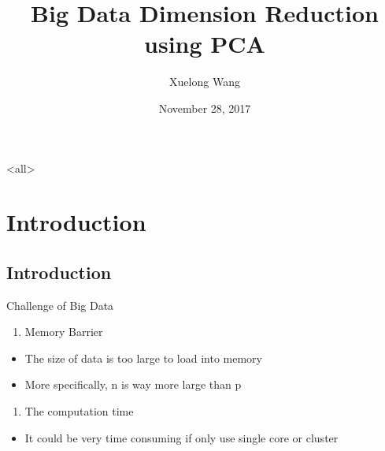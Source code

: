 \documentclass[ignorenonframetext,]{beamer}
\author[
Xuelong Wang
]{Xuelong Wang}
\date[
11/28/2017
]{
November 28, 2017
}
\providecommand{\tightlist}{%
  \setlength{\itemsep}{0pt}\setlength{\parskip}{0pt}}
\begin{document}
\mode<all>{
\title[
PCA on Big Data
]{
Big Data Dimension Reduction using PCA
}
}
\mode*

\frame{\titlepage}

\begin{frame}
\tableofcontents[hideallsubsections]
\end{frame}

\section{Introduction}\label{introduction}

\subsection{Introduction}\label{introduction-1}

\begin{frame}{Challenge of Big Data}

\begin{enumerate}
\def\labelenumi{\arabic{enumi}.}
\tightlist
\item
  Memory Barrier\\
\end{enumerate}

\begin{itemize}
\tightlist
\item
  The size of data is too large to load into memory
\item
  More specifically, n is way more large than p
\end{itemize}

\begin{enumerate}
\def\labelenumi{\arabic{enumi}.}
\setcounter{enumi}{1}
\tightlist
\item
  The computation time\\
\end{enumerate}

\begin{itemize}
\tightlist
\item
  It could be very time consuming if only use single core or cluster
\end{itemize}

\end{frame}
\end{document}
